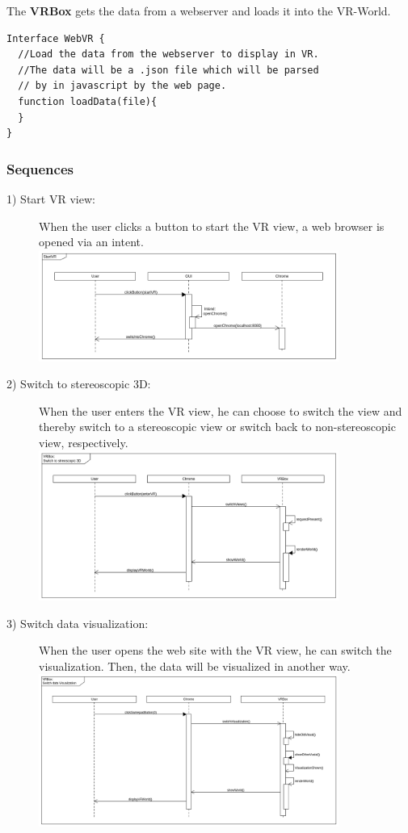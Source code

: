 The \textbf{VRBox} gets the data from a webserver and loads it into the VR-World.

\begin{lstlisting}
Interface WebVR {
  //Load the data from the webserver to display in VR.
  //The data will be a .json file which will be parsed
  // by in javascript by the web page.
  function loadData(file){
  }
}
\end{lstlisting}

\subsubsection{Sequences}

\begin{description}
	\item[1) Start VR view:] When the user clicks a button to start the VR view, a web browser is opened via an intent.  \\
	\includegraphics[width=0.8\textwidth]{diagramms/startVR.png}

	\item[2) Switch to stereoscopic 3D: ] When the user enters the VR view, he can choose to switch the view and thereby switch to a stereoscopic view or switch back to non-stereoscopic view, respectively. \\
	\includegraphics[width=0.8\textwidth]{diagramms/stereo.png}

	\item[3) Switch data visualization: ] When the user opens the web site with the VR view, he  can switch the visualization. Then, the data will be visualized in another way.  \\
	\includegraphics[width=0.8\textwidth]{diagramms/switchVisual.png}


\end{description}
